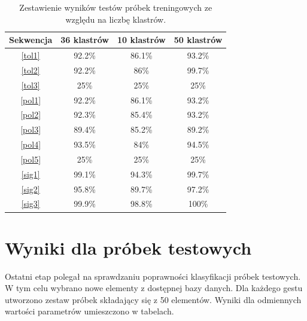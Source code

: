 \newpage

\begin{table} [h!]
	\centering
	\begin{tabular}{|c|c|c|c|}
		\hline
		\textbf{Sekwencja} 	& \textbf{36 klastrów} & \textbf{10 klastrów} & \textbf{50 klastrów} \\ \hline
		\ref{tol1} 	& 92.2\% 		& 86.1\%	& 93.2\% \\ \hline
		\ref{tol2} 	& 92.2\% 		& 86\%		& 99.7\% \\ \hline
		\ref{tol3}	& 25\%			& 25\%		& 25\%	 \\ \hline \hline
		\ref{pol1} 	& 92.2\% 		& 86.1\%	& 93.2\% \\ \hline
		\ref{pol2} 	& 92.3\% 		& 85.4\%	& 93.2\% \\ \hline
		\ref{pol3}	& 89.4\%		& 85.2\%	& 89.2\%	 \\ \hline
		\ref{pol4}	& 93.5\%		& 84\%		& 94.5\%	 \\ \hline
		\ref{pol5}	& 25\%			& 25\%		& 25\%	 \\ \hline \hline
		\ref{sig1}	& 99.1\% 		& 94.3\%	& 99.7\% \\ \hline
		\ref{sig2}	& 95.8\% 		& 89.7\%	& 97.2\% \\ \hline
		\ref{sig3}	& 99.9\%		& 98.8\%	& 100\%	 \\ \hline
	\end{tabular}
	\caption{Zestawienie wyników testów próbek treningowych ze względu na liczbę klastrów.}
	\label{tab: train}
\end{table}

\section{Wyniki dla próbek testowych}
Ostatni etap polegał na sprawdzaniu poprawności klasyfikacji próbek testowych. W tym celu wybrano nowe elementy z dostępnej bazy danych. Dla każdego gestu utworzono zestaw próbek składający się z 50 elementów. Wyniki dla odmiennych wartości parametrów umieszczono w tabelach. 

